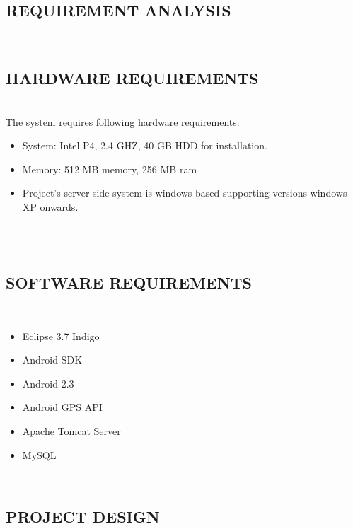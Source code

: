 \documentclass[12pt,a4paper]{article}
\begin{document}

\newpage
\pagestyle{plain} 
\begin{center}
\section{REQUIREMENT ANALYSIS}  
\end{center}
\\
\subsection{HARDWARE REQUIREMENTS}
\\
\hspace{0.7 cm} The system requires following hardware requirements:
\\
\begin{itemize}
\item System:	Intel P4, 2.4 GHZ, 40 GB HDD for installation. 
\\
\item Memory:	512 MB memory, 256 MB ram 
\\
\item Project’s server side system is windows based supporting versions windows XP onwards.  

\end{itemize}
\\
\\
\subsection{SOFTWARE REQUIREMENTS}
\\
\begin{itemize}
\item 	Eclipse 3.7 Indigo
\item Android SDK
\item Android 2.3
\item Android GPS API
\item Apache Tomcat Server
\item MySQL
\end{itemize}
\\

\newpage
\pagestyle{plain} 
\begin{center}
\section{PROJECT DESIGN}
\end{center}
\hspace{0.7cm}
\\
\end{document}
